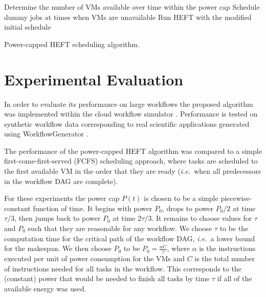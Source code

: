 \documentclass[10pt, conference, compsocconf]{IEEEtran} %
\newcommand{\ie}{\textit{i.e.}\ }
\begin{document}
\begin{algorithm}
  \begin{algorithmic}[1]
    \State Determine the number of VMs available over time within the power cap
    \State Schedule dummy jobs at times when VMs are unavailable
    \State Run HEFT with the modified initial schedule


  \end{algorithmic}
  \caption{Power-capped HEFT scheduling algorithm.}
  \label{alg:power-capped-heft}
\end{algorithm}

\section{Experimental Evaluation}

In order to evaluate its performance on large workflows the proposed algorithm was implemented within the cloud workflow simulator \cite{CloudWorkflowSimulator,malawski2012cost}.
Performance is tested on synthetic workflow data corresponding to real scientific applications generated using WorkflowGenerator \cite{WorkflowGenerator,Silva2014WorkflowGenerator}.

The performance of the power-capped HEFT algorithm was compared to a simple first-come-first-served (FCFS) scheduling approach, where tasks are scheduled to the first available VM in the order that they are ready (\ie when all predecessors in the workflow DAG are complete).

For these experiments the power cap $P(t)$ is chosen to be a simple piecewise-constant function of time.
It begins with power $P_0$, drops to power $P_0/2$ at time $\tau/3$, then jumps back to power $P_0$ at time $2\tau/3$.
It remains to choose values for $\tau$ and $P_0$ such that they are reasonable for any workflow.
We choose $\tau$ to be the computation time for the critical path of the workflow DAG, \ie a lower bound for the makespan.
We then choose $P_0$ to be $P_0 = \frac{\alpha C}{\tau}$, where $\alpha$ is the instructions executed per unit of power consumption for the VMs and $C$ is the total number of instructions needed for all tasks in the workflow.
This corresponds to the (constant) power that would be needed to finish all tasks by time $\tau$ if all of the available energy was used.
\end{document}
